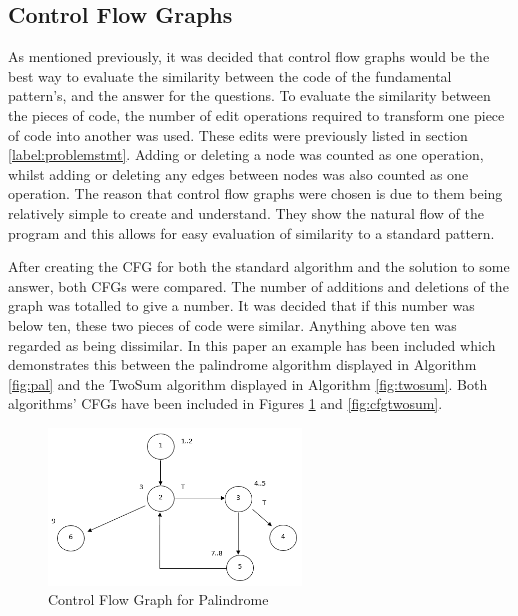 \documentclass[10pt,twocolumn]{IEEEtran}
\begin{document}
\subsection{Control Flow Graphs}
\label{label:CFG}
As mentioned previously, it was decided that control flow graphs \cite{softwaretesting} would be the best way to evaluate the similarity between the code of the fundamental pattern’s, and the answer for the questions. To evaluate the similarity between the pieces of code, the number of edit operations required to transform one piece of code into another was used. These edits were previously listed in section \ref{label:problemstmt}. Adding or deleting a node was counted as one operation, whilst adding or deleting any edges between nodes was also counted as one operation. The reason that control flow graphs were chosen is due to them being relatively simple to create and understand. They show the natural flow of the program and this allows for easy evaluation of similarity to a standard pattern.
\par After creating the CFG for both the standard algorithm and the solution to some answer, both CFGs were compared. The number of additions and deletions of the graph was totalled to give a number. It was decided that if this number was below ten, these two pieces of code were similar. Anything above ten was regarded as being dissimilar. In this paper an example has been included which demonstrates this between the palindrome algorithm displayed in Algorithm \ref{fig:pal} and the TwoSum algorithm displayed in Algorithm \ref{fig:twosum}. Both algorithms' CFGs have been included in Figures \ref{fig:cfgpal} and \ref{fig:cfgtwosum}. 
 \begin{figure}[h]
\includegraphics[width=0.6\textwidth]{CFGPalindrome.png}
\caption{Control Flow Graph for Palindrome}
\label{fig:cfgpal}
\end{figure}
\end{document}
